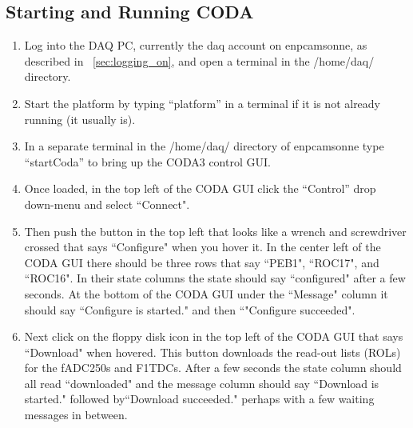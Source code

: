 \documentclass[oneside]{book}   %
\begin{document}
\subsection{Starting and Running CODA}
\label{ssec:running_coda}

\begin{enumerate}
	\item Log into the DAQ PC, currently the daq account on enpcamsonne, as described in ~\ref{sec:logging_on}, and open a terminal in the /home/daq/ directory.%
	\item Start the platform by typing ``platform'' in a terminal if it is not already running (it usually is).
	\item In a separate terminal in the /home/daq/ directory of enpcamsonne type ``startCoda'' to bring up the CODA3 control GUI.
	\item Once loaded, in the top left of the CODA GUI click the ``Control'' drop down-menu and select ``Connect". 
	\item Then push the button in the top left that looks like a wrench and screwdriver crossed that says ``Configure" when you hover it. In the center left of the CODA GUI there should be three rows that say ``PEB1", ``ROC17", and ``ROC16". In their state columns the state should say ``configured" after a few seconds. At the bottom of the CODA GUI under the ``Message" column it should say ``Configure is started." and then ``"Configure succeeded". 
	\item Next click on the floppy disk icon in the top left of the CODA GUI that says ``Download" when hovered. This button downloads the read-out lists (ROLs) for the fADC250s and F1TDCs. After a few seconds the state column should all read ``downloaded" and the message column should say ``Download is started." followed by``Download succeeded." perhaps with a few waiting messages in between.

\end{enumerate}
\end{document}
